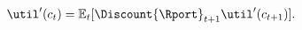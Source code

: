   \begin{equation}\begin{gathered}\begin{aligned}
    \util^{\prime}({c}_{t})  & = \Ex_{t}[\Discount {\Rport}_{t+1} \util^{\prime}({c}_{t+1})]. \label{eq:EulercRiskyR}
  \end{aligned}\end{gathered}\end{equation}
